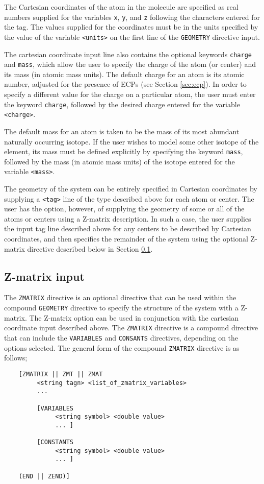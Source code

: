 The Cartesian coordinates of the atom in the molecule are specified as
real numbers supplied for the variables \verb+x+, \verb+y+, and \verb+z+
following the characters entered for the tag.
The values supplied for the coordinates must be in the units specified
by the value of the variable \verb+<units>+ on the first line of
the \verb+GEOMETRY+ directive input.

The cartesian coordinate input line also contains the optional
keywords \verb+charge+ and \verb+mass+, which allow the user to
specify the charge of the atom (or center) and its mass (in atomic
mass units).  The default charge for an atom is its atomic number,
adjusted for the presence of ECPs (see Section \ref{sec:ecp}).  In
order to specify a different value for the charge on a particular
atom, the user must enter the keyword \verb+charge+, followed by the
desired charge entered for the variable \verb+<charge>+.

The default mass for an atom is taken to be the mass of its most
abundant naturally occurring isotope.  If the user wishes to model
some other isotope of the element, its mass must be defined explicitly
by specifying the keyword \verb+mass+, followed by the mass (in atomic
mass units) of the isotope entered for the variable \verb+<mass>+.

The geometry of the system can be entirely specified in Cartesian coordinates
by supplying a \verb+<tag>+ line of the type described above for each atom
or center.  The user has
the option, however, of supplying the geometry of some or all of the atoms 
or centers using a Z-matrix description.  In such a case, the user supplies
the input tag line described above for any centers 
to be described by Cartesian coordinates, and then specifies the remainder
of the system using the optional
Z-matrix directive described below in Section \ref{sec:Z-matrix}.

\subsection{Z-matrix input}
\label{sec:Z-matrix}

The \verb+ZMATRIX+ directive is an optional directive that can be used within
the compound \verb+GEOMETRY+ directive to specify the structure of the system with a
Z-matrix.  The Z-matrix option can be used in conjunction with the cartesian
coordinate input described above.  The \verb+ZMATRIX+ directive is a compound
directive that can include the \verb+VARIABLES+ and \verb+CONSANTS+
directives, depending on the options selected.  The general form of the 
compound \verb+ZMATRIX+ 
directive is as follows;
\begin{verbatim}
    [ZMATRIX || ZMT || ZMAT
         <string tagn> <list_of_zmatrix_variables> 
         ... 

         [VARIABLES
              <string symbol> <double value>
              ... ]
 
         [CONSTANTS
              <string symbol> <double value>
              ... ]

    (END || ZEND)]
\end{verbatim}

